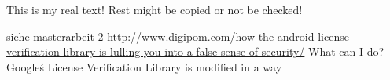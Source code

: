 This is my real text! Rest might be copied or not be checked!


siehe masterarbeit 2
\url{http://www.digipom.com/how-the-android-license-verification-library-is-lulling-you-into-a-false-sense-of-security/} What can I do?
\newline
 Google\'s License Verification Library is modified in a way
